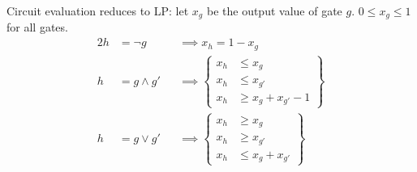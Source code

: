 Circuit evaluation reduces to LP:
let \(x_g\) be the output value of gate \(g\). \(0\leq x_g \leq 1\) for all gates.
\begin{alignat}{2}
	h &= \lnot g &&\implies x_h = 1 - x_g \\
	h &= g \land g' &&\implies \left\{\begin{aligned}
		x_h &\leq x_g \\
		x_h &\leq  x_{g'} \\
		x_h &\geq x_g + x_{g'} - 1
	\end{aligned}\right\}\\
	h &= g \lor g' &&\implies \left\{\begin{aligned}
	x_h &\geq x_g \\
	x_h &\geq  x_{g'} \\
	x_h &\leq x_g + x_{g'}
	\end{aligned}\right\}
\end{alignat}